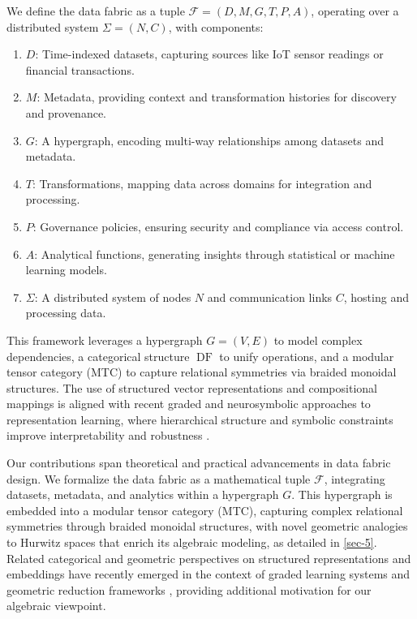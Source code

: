 \documentclass{amsart}
\newcommand\cF{\mathcal{F}}
\DeclareMathOperator\DF{DF}
\begin{document}
We define the data fabric as a tuple \( \cF = (D, M, G, T, P, A) \), operating over a distributed system \( \Sigma = (N, C) \), with components:
\begin{enumerate}
    \item \( D \): Time-indexed datasets, capturing sources like IoT sensor readings or financial transactions.
    \item \( M \): Metadata, providing context and transformation histories for discovery and provenance.
    \item \( G \): A hypergraph, encoding multi-way relationships among datasets and metadata.
    \item \( T \): Transformations, mapping data across domains for integration and processing.
    \item \( P \): Governance policies, ensuring security and compliance via access control.
    \item \( A \): Analytical functions, generating insights through statistical or machine learning models.
    \item \( \Sigma \): A distributed system of nodes \( N \) and communication links \( C \), hosting and processing data.
\end{enumerate}

This framework leverages a hypergraph \( G = (V, E) \) to model complex dependencies, a categorical structure \( \DF \) to unify operations, and a modular tensor category (MTC) to capture relational symmetries via braided monoidal structures. The use of structured vector representations and compositional mappings is aligned with recent graded and neurosymbolic approaches to representation learning, where hierarchical structure and symbolic constraints improve interpretability and robustness \cite{sh-89, 2024-02}.

Our contributions span theoretical and practical advancements in data fabric design. We formalize the data fabric as a mathematical tuple \( \cF \), integrating datasets, metadata, and analytics within a hypergraph \( G \). This hypergraph is embedded into a modular tensor category (MTC), capturing complex relational symmetries through braided monoidal structures, with novel geometric analogies to Hurwitz spaces that enrich its algebraic modeling, as detailed in \cref{sec-5}. Related categorical and geometric perspectives on structured representations and embeddings have recently emerged in the context of graded learning systems and geometric reduction frameworks \cite{sh-95, 2024-05}, providing additional motivation for our algebraic viewpoint.
\end{document}
